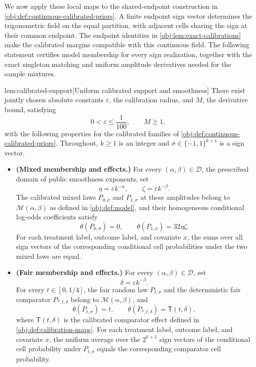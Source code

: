 We now apply these local maps to the shared-endpoint construction in \cref{obj:def:continuous-calibrated-priors}. A finite endpoint sign vector  determines the trigonometric field on the equal partition, with adjacent cells sharing the sign at their common endpoint. The endpoint identities in \cref{obj:lem:exact-calibrations} make the calibrated margins compatible with this continuous field. The following statement certifies model membership for every sign realization, together with the exact singleton matching and uniform amplitude derivatives needed for the sample mixtures.

\begin{lemmav}{lem:calibrated-support}[Uniform calibrated support and smoothness]
There exist jointly chosen absolute constants \(\varepsilon\), the calibration radius, and \(M\), the derivative bound, satisfying
\[
0<\varepsilon\le \frac{1}{100},
\qquad M\ge 1,
\]
with the following properties for the calibrated families of \cref{obj:def:continuous-calibrated-priors}. Throughout, \(k\ge1\) is an integer and \(\sigma\in\{-1,1\}^{k+1}\) is a sign vector.

\begin{itemize}
\item \textbf{(Mixed membership and effects.)}
For every \((\alpha,\beta)\in\mathcal D\), the prescribed domain of public smoothness exponents, set
\[
\eta=\varepsilon k^{-\alpha},
\qquad
\zeta=\varepsilon k^{-\beta}.
\]
The calibrated mixed laws \(P_{0,\sigma}\) and \(P_{1,\sigma}\) at these amplitudes belong to \(\mathcal M(\alpha,\beta)\) as defined in \cref{obj:def:model}, and their homogeneous conditional log-odds coefficients satisfy
\[
\theta(P_{0,\sigma})=0,
\qquad
\theta(P_{1,\sigma})=32\eta\zeta.
\]
For each treatment label, outcome label, and covariate \(x\), the sums over all sign vectors of the corresponding conditional cell probabilities under the two mixed laws are equal.

\item \textbf{(Fair membership and effects.)}
For every \((\alpha,\beta)\in\mathcal D\), set
\[
\delta=\varepsilon k^{-\beta}.
\]
For every \(t\in[0,1/4]\), the fair random law \(P_{t,\sigma}\) and the deterministic fair comparator \(P_{*,t,\delta}\) belong to \(\mathcal M(\alpha,\beta)\), and
\[
\theta(P_{t,\sigma})=t,
\qquad
\theta(P_{*,t,\delta})=\mathsf T(t,\delta),
\]
where \(\mathsf T(t,\delta)\) is the calibrated comparator effect defined in \cref{obj:def:calibration-maps}. For each treatment label, outcome label, and covariate \(x\), the uniform average over the \(2^{k+1}\) sign vectors of the conditional cell probability under \(P_{t,\sigma}\) equals the corresponding comparator cell probability.


\end{itemize}
\end{lemmav}
